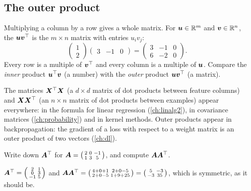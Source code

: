 \subsection{The outer product}

Multiplying a column by a row gives a whole matrix. For $\bm{u} \in \mathbb{R}^m$ and
$\bm{v} \in \mathbb{R}^n$, the  $\bm{u}\bm{v}^\top$ is the $m\times n$ matrix
with entries $u_iv_j$:
\[
  \begin{pmatrix} 1\\ 2\end{pmatrix}\begin{pmatrix} 3 & -1 & 0\end{pmatrix}
  = \begin{pmatrix} 3 & -1 & 0\\ 6 & -2 & 0\end{pmatrix}.
\]
Every row is a multiple of $\bm{v}^\top$ and every column is a multiple of $\bm{u}$.
Compare the \emph{inner} product $\bm{u}^\top\bm{v}$ (a number) with the \emph{outer}
product $\bm{u}\bm{v}^\top$ (a matrix).

\begin{mlnote}
The matrices $\bm{X}^\top\bm{X}$ (a $d\times d$ matrix of dot products between
feature columns) and $\bm{X}\bm{X}^\top$ (an $n\times n$ matrix of dot products
between examples) appear everywhere: in the formula for linear regression
(\cref{ch:linalg2}), in covariance matrices (\cref{ch:probability}) and in
kernel methods. Outer products appear in backpropagation: the gradient of a
loss with respect to a weight matrix is an outer product of two vectors
(\cref{ch:dl}).
\end{mlnote}

\sectionexercises

\begin{exercise}
Write down $\bm{A}^\top$ for
$\bm{A} = \left(\begin{smallmatrix} 2 & 0 & -1\\ 1 & 3 & 5\end{smallmatrix}\right)$,
and compute $\bm{A}\bm{A}^\top$.
\end{exercise}
\begin{solution}
$\bm{A}^\top = \left(\begin{smallmatrix} 2 & 1\\ 0 & 3\\ -1 & 5\end{smallmatrix}\right)$
and $\bm{A}\bm{A}^\top = \left(\begin{smallmatrix} 4 + 0 + 1 & 2 + 0 - 5\\ 2 + 0 - 5
& 1 + 9 + 25\end{smallmatrix}\right) = \left(\begin{smallmatrix} 5 & -3\\ -3 &
35\end{smallmatrix}\right)$, which is symmetric, as it should be.
\end{solution}

